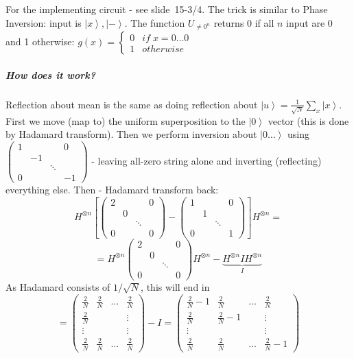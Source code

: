 \documentclass{scrartcl}
\newcommand{\ket}[1]{\left| #1 \right>} %
\newcommand{\slide}[2]{slide~#1/#2} %
\begin{document}
For the implementing circuit - see \slide{15-3}4. The trick is similar to Phase
Inversion: input is $\ket x, \ket-$. The function $U_{\neq 0^n}$ returns 0 if
all $n$ input are 0 and 1 otherwise: $g(x) = \left\{\begin{array}{cl} 0 & if \;
    x = 0 \dots 0 \\ 1 & otherwise \end{array} \right.$ 

\subparagraph{How does it work?}
Reflection about mean is the same as doing reflection about $\ket u =
\frac1{\sqrt N} \sum_x \ket x$. First we move (map to) the uniform superposition
to the $\ket 0$ vector (this is done by Hadamard transform). Then we perform
inversion about $\ket{0 \dots }$ using $\left(\begin{array}{cccc} 1 & & & 0 \\ &
    -1 & & \\ &  & \ddots & \\ 0 & & & -1 \end{array} \right)$  - leaving
all-zero string alone and inverting (reflecting) everything else. Then -
Hadamard transform back:
$$H^{\otimes n} \left[
  \begin{pmatrix} 2 & & & 0 \\  & 0 & \\ & & \ddots \\ 0 & & & 0
  \end{pmatrix} - \begin{pmatrix} 1 & & & 0 \\  & 1 & \\ & & \ddots \\ 0 & & &
    1  \end{pmatrix}\right] H^{\otimes n}= $$ $$= H^{\otimes n}
  \begin{pmatrix} 2 & & & 0 \\  & 0 & \\ & & \ddots \\ 0 & & & 0
  \end{pmatrix} H^{\otimes n} - \underbrace{ H^{\otimes n} I H^{\otimes
      n}}_{I}$$
As Hadamard consists of $1/\sqrt{N}$, this will end in
$$= \begin{pmatrix} \frac2N &\frac2N & \dots  & \frac2N \\ 
  \frac2N& & & \vdots \\ \vdots & & & \vdots \\ \frac2N & \frac2N & \dots & \frac2N
  \end{pmatrix} - I = \begin{pmatrix} \frac2N-1 &\frac2N & \dots  & \frac2N \\ 
  \frac2N&\frac2N - 1 & & \vdots \\ \vdots & & & \vdots \\ \frac2N & \frac2N &
  \dots & \frac2N-1\end{pmatrix}$$ 
\end{document}
